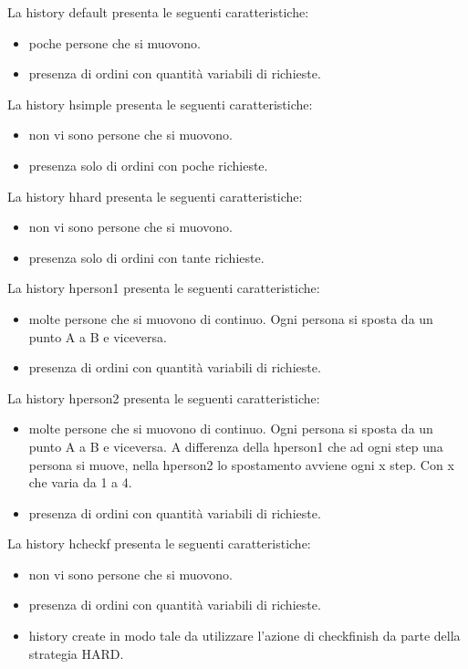 La history default presenta le seguenti caratteristiche:
\begin{itemize}
  \item poche persone che si muovono.
  \item presenza di ordini con quantità variabili di richieste.
\end{itemize}
La history hsimple presenta le seguenti caratteristiche:
\begin{itemize}
    \item non vi sono persone che si muovono.
    \item presenza solo di ordini con poche richieste.
  \end{itemize}
La history hhard presenta le seguenti caratteristiche:
\begin{itemize}
    \item non vi sono persone che si muovono.
    \item presenza solo di ordini con tante richieste.
  \end{itemize}
La history hperson1 presenta le seguenti caratteristiche:
\begin{itemize}
    \item molte persone che si muovono di continuo. Ogni persona si sposta da un punto A a B e viceversa.
    \item presenza di ordini con quantità variabili di richieste.
\end{itemize}
La history hperson2 presenta le seguenti caratteristiche:
\begin{itemize}
    \item molte persone che si muovono di continuo. Ogni persona si sposta da un punto A a B e viceversa. A differenza della hperson1 che ad ogni step una persona si muove, nella hperson2 lo spostamento avviene ogni x step. Con x che varia da 1 a 4.
    \item presenza di ordini con quantità variabili di richieste.
\end{itemize}
La history hcheckf presenta le seguenti caratteristiche:
\begin{itemize}
    \item non vi sono persone che si muovono.
    \item presenza di ordini con quantità variabili di richieste.
    \item history create in modo tale da utilizzare l'azione di checkfinish da parte della strategia HARD.
\end{itemize}


